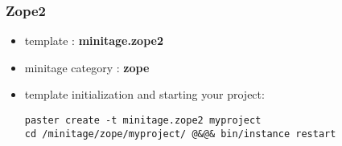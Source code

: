\documentclass[letterpaper,10pt,english]{sphinxmanual}
\begin{document}
\subsubsection{Zope2}
\label{paster/projects/model_projects:zope2}\label{paster/projects/model_projects:minitagezope2}\begin{itemize}
\item {} 
template : \textbf{minitage.zope2}

\item {} 
minitage category : \textbf{zope}

\item {} 
template initialization and starting your project:

\begin{Verbatim}[commandchars=@\[\]]
paster create -t minitage.zope2 myproject
cd /minitage/zope/myproject/ @&@& bin/instance restart
\end{Verbatim}

\end{itemize}
\end{document}
